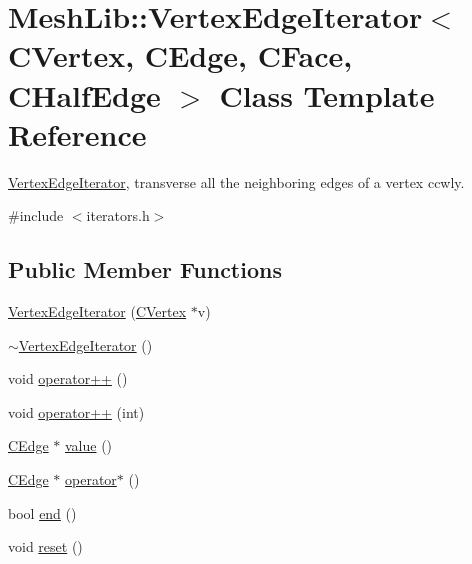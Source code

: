 \hypertarget{class_mesh_lib_1_1_vertex_edge_iterator}{}\section{Mesh\+Lib\+:\+:Vertex\+Edge\+Iterator$<$ C\+Vertex, C\+Edge, C\+Face, C\+Half\+Edge $>$ Class Template Reference}
\label{class_mesh_lib_1_1_vertex_edge_iterator}


\hyperlink{class_mesh_lib_1_1_vertex_edge_iterator}{Vertex\+Edge\+Iterator}, transverse all the neighboring edges of a vertex ccwly.  




{\ttfamily \#include $<$iterators.\+h$>$}

\subsection*{Public Member Functions}
\begin{DoxyCompactItemize}
\item 
\hyperlink{class_mesh_lib_1_1_vertex_edge_iterator_a86457aa30a6d640cda9c8b3b97fd7174}{Vertex\+Edge\+Iterator} (\hyperlink{class_mesh_lib_1_1_c_vertex}{C\+Vertex} $\ast$v)
\item 
\hyperlink{class_mesh_lib_1_1_vertex_edge_iterator_a23590246bf96e041f5d7145ba631dfe2}{$\sim$\+Vertex\+Edge\+Iterator} ()
\item 
void \hyperlink{class_mesh_lib_1_1_vertex_edge_iterator_ac2206f69171aa3f710fb89a79f54e89a}{operator++} ()
\item 
void \hyperlink{class_mesh_lib_1_1_vertex_edge_iterator_a708974f510396a4259d5df845d4989c8}{operator++} (int)
\item 
\hyperlink{class_mesh_lib_1_1_c_edge}{C\+Edge} $\ast$ \hyperlink{class_mesh_lib_1_1_vertex_edge_iterator_a79b63100c69c37657be3417e34e87f84}{value} ()
\item 
\hyperlink{class_mesh_lib_1_1_c_edge}{C\+Edge} $\ast$ \hyperlink{class_mesh_lib_1_1_vertex_edge_iterator_ad5b1002a67c0ff413176b41f4fee95a9}{operator$\ast$} ()
\item 
bool \hyperlink{class_mesh_lib_1_1_vertex_edge_iterator_a8cd0567e499cbff91f38dabc2a3c6094}{end} ()
\item 
void \hyperlink{class_mesh_lib_1_1_vertex_edge_iterator_a6df33dbad8019d37a869f18e82e79f8f}{reset} ()
\end{DoxyCompactItemize}


